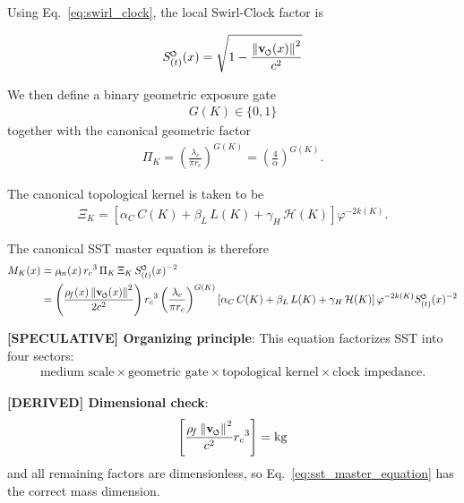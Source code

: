 \documentclass[11pt]{article}
\theoremstyle{definition}
\theoremstyle{plain}
\theoremstyle{remark}
\newcommand{\swirlarrow}{\mathchoice{\mkern-2mu\scriptstyle\boldsymbol{\circlearrowleft}}{\mkern-2mu\scriptstyle\boldsymbol{\circlearrowleft}}{\mkern-2mu\scriptscriptstyle\boldsymbol{\circlearrowleft}}{\mkern-2mu\scriptscriptstyle\boldsymbol{\circlearrowleft}}}
\newcommand{\vswirl}{\mathbf{v}_{\swirlarrow}}
\newcommand{\rhoF}{{\rho_{\!f}}}
\newcommand{\rhoM}{\rho_{\!m}}
\newcommand{\SwirlClock}{{S_{(t)}^{\swirlarrow}}}
\newcommand{\rc}{{r_c}}
\begin{document}
        Using Eq.~\ref{eq:swirl_clock}, the local Swirl-Clock factor is

        \begin{align}
            \SwirlClock(x) = \sqrt{1 - \frac{\norm{\vswirl(x)}^2}{c^2}}
        \end{align}

        We then define a binary geometric exposure gate
        \begin{align}
            G(K) \in \{0,1\}
        \end{align}
        together with the canonical geometric factor
        \begin{align}
            \Pi_K = \left( \frac{\lambda_c}{\pi \rc} \right)^{G(K)} = \left( \frac{4}{\alpha} \right)^{G(K)} .
        \end{align}

        The canonical topological kernel is taken to be
        \begin{align}
            \Xi_K = \left[ \alpha_C\,C(K) + \beta_L\,L(K) + \gamma_H\,\mathcal{H}(K) \right] \varphi^{-2k(K)} .
        \end{align}

        The canonical SST master equation is therefore
        \begin{align}
            M_K(x)
            &= \rhoM(x)\,\rc^3\,\Pi_K\,\Xi_K\,\SwirlClock(x)^{-2} \\
            &= \left( \frac{\rhoF(x)\,\norm{\vswirl(x)}^2}{2c^2} \right)
               \rc^3
               \left( \frac{\lambda_c}{\pi \rc} \right)^{G(K)}
               \left[ \alpha_C\,C(K) + \beta_L\,L(K) + \gamma_H\,\mathcal{H}(K) \right]
               \varphi^{-2k(K)}
               \SwirlClock(x)^{-2}
            \label{eq:sst_master_equation}
        \end{align}

        \textbf{[SPECULATIVE] Organizing principle}: This equation factorizes SST into four sectors:
        \begin{align}
            \text{medium scale} \times \text{geometric gate} \times \text{topological kernel} \times \text{clock impedance} .
        \end{align}

        \textbf{[DERIVED] Dimensional check}:
        \begin{align}
            \left[ \frac{\rhoF\,\norm{\vswirl}^2}{c^2} \rc^3 \right] = \mathrm{kg}
        \end{align}
        and all remaining factors are dimensionless, so Eq.~\ref{eq:sst_master_equation} has the correct mass dimension.
\end{document}

